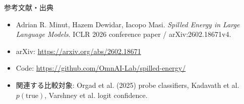 \documentclass[dvipdfmx,uplatex,unicode,9pt,aspectratio=169]{beamer}
\begin{document}
\begin{frame}{参考文献・出典}
\begin{itemize}
\item Adrian R. Minut, Hazem Dewidar, Iacopo Masi. \textit{Spilled Energy in Large Language Models}. ICLR 2026 conference paper / arXiv:2602.18671v4.
\item arXiv: \url{https://arxiv.org/abs/2602.18671}
\item Code: \url{https://github.com/OmnAI-Lab/spilled-energy/}
\item 関連する比較対象: Orgad et al. (2025) probe classifiers, Kadavath et al. $p(\mathrm{true})$, Varshney et al. logit confidence.
\end{itemize}
\vspace{1em}
\begin{center}

\end{center}
\end{frame}
\end{document}
